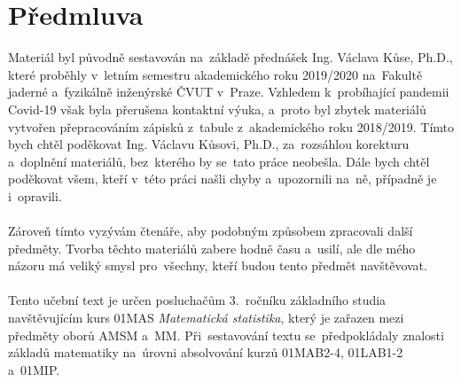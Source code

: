 \chapter*{Předmluva}

Materiál byl původně sestavován na~základě přednášek Ing. Václava Kůse, Ph.D., které proběhly v~letním semestru akademického roku 2019/2020 na~Fakultě jaderné a~fyzikálně inženýrské ČVUT v~Praze. Vzhledem k~probíhající pandemii Covid-19 však byla přerušena kontaktní výuka, a~proto byl zbytek materiálů vytvořen přepracováním zápisků z~tabule z~akademického roku 2018/2019. Tímto bych chtěl poděkovat Ing. Václavu Kůsovi, Ph.D., za~rozsáhlou korekturu a~doplnění materiálů, bez~kterého by se~tato práce neobešla. Dále bych chtěl poděkovat všem, kteří v~této práci našli chyby a~upozornili na~ně, případně je i~opravili.\\ ~\\
Zároveň tímto vyzývám čtenáře, aby podobným způsobem zpracovali další předměty. Tvorba těchto materiálů zabere hodně času a~usilí, ale dle mého názoru má veliký smysl pro~všechny, kteří budou tento předmět navštěvovat. \\~\\
Tento učební text je určen posluchačům 3.~ročníku základního studia navštěvujícím kurs 01MAS \emph{Matematická statistika}, který je zařazen 
mezi předměty oborů AMSM a~MM. Při~sestavování textu se~předpokládaly znalosti základů matematiky na~úrovni absolvování kurzů 01MAB2-4, 01LAB1-2 a~01MIP.

~

  
 
